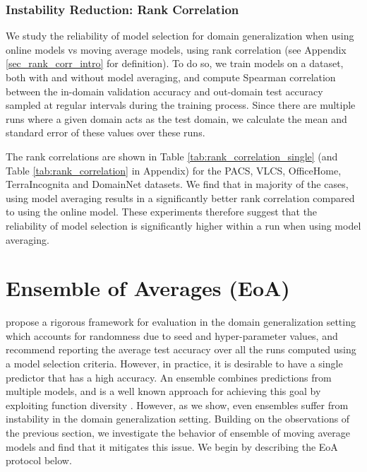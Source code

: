 \documentclass{article}
\begin{document}
\subsubsection{Instability Reduction: Rank Correlation}
\label{sec_rank_corr}

We study the reliability of model selection for domain generalization when using online models vs moving average models, using rank correlation (see Appendix \ref{sec_rank_corr_intro} for definition). To do so, we train models on a dataset, both with and without model averaging, and compute Spearman correlation between the in-domain validation accuracy and out-domain test accuracy sampled at regular intervals during the training process. Since there are multiple runs where a given domain acts as the test domain, we calculate the mean and standard error of these values over these runs.

The rank correlations are shown in Table \ref{tab:rank_correlation_single} (and Table \ref{tab:rank_correlation} in Appendix) for the PACS, VLCS, OfficeHome, TerraIncognita and DomainNet datasets. We find that in majority of the cases, using model averaging results in a significantly better rank correlation compared to using the online model. These experiments therefore suggest that the reliability of model selection is significantly higher within a run when using model averaging.



\section{Ensemble of Averages (EoA)}
\label{sec_eoa}

\cite{gulrajani2020search} propose a rigorous framework for evaluation in the domain generalization setting which accounts for randomness due to seed and hyper-parameter values, and recommend reporting the average test accuracy over all the runs computed using a model selection criteria. However, in practice, it is desirable to have a single predictor that has a high accuracy. An ensemble combines predictions from multiple models, and is a well known approach for achieving this goal \cite{dietterich2000ensemble} by exploiting function diversity \cite{fort2019deep}. However, as we show, even ensembles suffer from instability in the domain generalization setting. Building on the observations of the previous section, we investigate the behavior of ensemble of moving average models and find that it mitigates this issue. We begin by describing the EoA protocol below.
\end{document}
